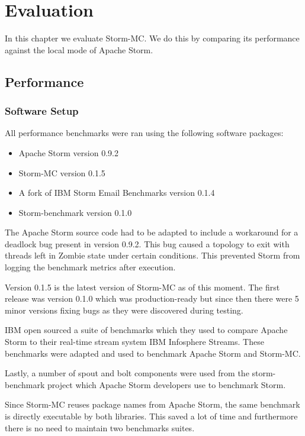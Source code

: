\chapter{Evaluation}

In this chapter we evaluate Storm-MC. We do this by comparing its performance against the local mode of Apache Storm.

\section{Performance}

\subsection{Software Setup}


All performance benchmarks were ran using the following software packages:

\begin{itemize}
	\item Apache Storm version 0.9.2
	\item Storm-MC version 0.1.5
	\item A fork of IBM Storm Email Benchmarks version 0.1.4
	\item Storm-benchmark version 0.1.0
\end{itemize}

The Apache Storm source code had to be adapted to include a workaround for a deadlock bug present in version 0.9.2. This bug caused a topology to exit with threads left in Zombie state under certain conditions. This prevented Storm from logging the benchmark metrics after execution.

Version 0.1.5 is the latest version of Storm-MC as of this moment. The first release was version 0.1.0 which was production-ready but since then there were 5 minor versions fixing bugs as they were discovered during testing.

IBM open sourced a suite of benchmarks which they used to compare Apache Storm to their real-time stream system IBM Infosphere Streams. These benchmarks were adapted and used to benchmark Apache Storm and Storm-MC.

Lastly, a number of spout and bolt components were used from the storm-benchmark project which Apache Storm developers use to benchmark Storm.

Since Storm-MC reuses package names from Apache Storm, the same benchmark is directly executable by both libraries. This saved a lot of time and furthermore there is no need to maintain two benchmarks suites.

